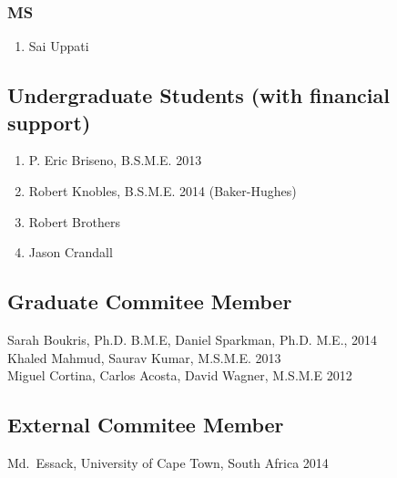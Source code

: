 \subsubsection*{MS}
\begin{enumerate}
  \item Sai Uppati
\end{enumerate}

\subsection*{Undergraduate Students (with financial support)}
  \begin{enumerate}
    \item P. Eric Briseno, B.S.M.E. 2013
    \item Robert Knobles, B.S.M.E. 2014 (Baker-Hughes)
    \item Robert Brothers
    \item Jason Crandall
  \end{enumerate}

\subsection*{Graduate Commitee Member}
Sarah Boukris, Ph.D. B.M.E, Daniel Sparkman, Ph.D. M.E., 2014 \\
Khaled Mahmud, Saurav Kumar, M.S.M.E. 2013 \\
Miguel Cortina, Carlos Acosta, David Wagner, M.S.M.E 2012 
\subsection*{External Commitee Member}
Md.~Essack, University of Cape Town, South Africa 2014


